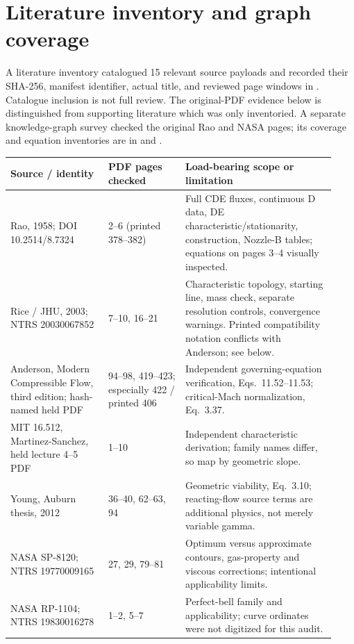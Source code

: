 \section{Literature inventory and graph coverage}
A literature inventory catalogued 15 relevant source payloads and recorded their SHA-256,
manifest identifier, actual title, and reviewed page windows in
. Catalogue inclusion is not full review.
The original-PDF evidence below is distinguished from supporting literature which
was only inventoried. A separate knowledge-graph survey checked
the original Rao and NASA pages; its coverage and equation inventories are in
 and .

\begin{longtable}{@{}P{0.28\linewidth}P{0.22\linewidth}P{0.43\linewidth}@{}}
\toprule\textbf{Source / identity} & \textbf{PDF pages checked} & \textbf{Load-bearing scope or limitation}\\\midrule
\endhead
Rao, 1958; DOI 10.2514/8.7324 & 2--6 (printed 378--382) & Full CDE fluxes, continuous D data, DE characteristic/stationarity, construction, Nozzle-B tables; equations on pages 3--4 visually inspected.\\
Rice / JHU, 2003; NTRS 20030067852 & 7--10, 16--21 & Characteristic topology, starting line, mass check, separate resolution controls, convergence warnings. Printed compatibility notation conflicts with Anderson; see below.\\
Anderson, Modern Compressible Flow, third edition; hash-named held PDF & 94--98, 419--423; especially 422 / printed 406 & Independent governing-equation verification, Eqs.~11.52--11.53; critical-Mach normalization, Eq.~3.37.\\
MIT 16.512, Martinez-Sanchez, held lecture 4--5 PDF & 1--10 & Independent characteristic derivation; family names differ, so map by geometric slope.\\
Young, Auburn thesis, 2012 & 36--40, 62--63, 94 & Geometric viability, Eq.~3.10; reacting-flow source terms are additional physics, not merely variable gamma.\\
NASA SP-8120; NTRS 19770009165 & 27, 29, 79--81 & Optimum versus approximate contours, gas-property and viscous corrections; intentional applicability limits.\\
NASA RP-1104; NTRS 19830016278 & 1--2, 5--7 & Perfect-bell family and applicability; curve ordinates were not digitized for this audit.\\

\end{longtable}
